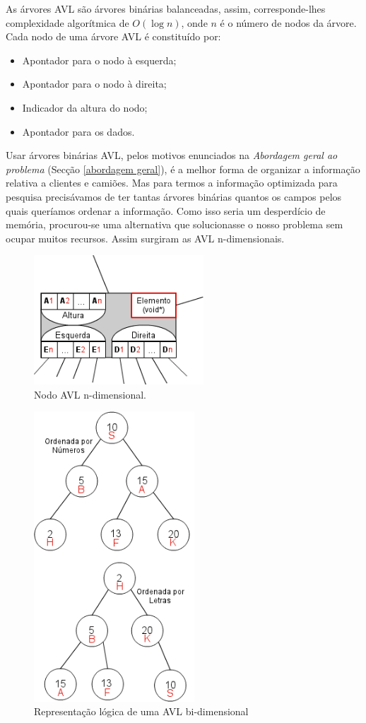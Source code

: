 \documentclass[a5paper,twocolumn, 11pt]{article}
\def\hyph{-\penalty0\hskip0pt\relax}
\begin{document}
As árvores AVL são árvores binárias balanceadas, assim, corresponde-lhes complexidade algorítmica de $O(\log n)$, onde $n$ é o número de nodos da árvore. Cada nodo de uma árvore AVL é constituído por:
\begin{itemize}
\item{Apontador para o nodo à esquerda;}
\item{Apontador para o nodo à direita;}
\item{Indicador da altura do nodo;}
\item{Apontador para os dados.}
\end{itemize}
Usar árvores binárias AVL, pelos motivos enunciados na \emph{Abordagem geral ao problema} (Secção \ref{abordagem geral}), é a melhor forma de organizar a informação relativa a clientes e camiões. Mas para termos a informação optimizada para pesquisa precisávamos de ter tantas árvores binárias quantos os campos pelos quais queríamos ordenar a informação. Como isso seria um desperdício de memória, procurou-se uma alternativa que solucionasse o nosso problema sem ocupar muitos recursos. Assim surgiram as AVL n\hyph{}dimensionais.
\begin{figure}[hbt]
    \caption[Nodo AVL n\hyph{}dimensional]{Nodo AVL n\hyph{}dimensional.}
    \label{nodo avl ndimensional}
    \centering
        \includegraphics[width=180pt]{nodo_ndavl.png}
\end{figure}
\begin{figure}[hbt]
    \caption[Representação lógica AVL bi\hyph{}dimensional]{Representação lógica de uma AVL bi\hyph{}dimensional}
    \label{duas avl comuns}
    \centering
        \includegraphics[width=170pt]{duas_avl_comuns.png}
\end{figure}
\end{document}
